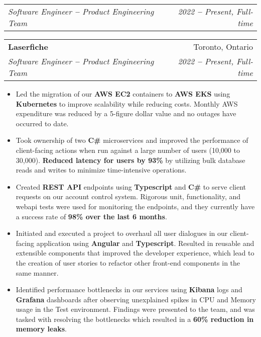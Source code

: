 \documentclass[letterpaper,10pt]{article}
\makeatletter
\newcommand{\resumeItem}[1]{
  \item\small{
    {#1 \vspace{-2pt}}
  }
}
\newcommand{\resumeSubheading}[4]{
  \vspace{-2pt}\item
    \ifthenelse{\equal{#1}{}}
    {
    \begin{tabular*}{0.97\textwidth}[t]{l@{\extracolsep{\fill}}r}
      \textit{\small#3} & \textit{\small #4} \\
    \end{tabular*}\vspace{-7pt}
    }
    {
    \begin{tabular*}{0.97\textwidth}[t]{l@{\extracolsep{\fill}}r}
      \textbf{#1} & #2 \\
      \textit{\small#3} & \textit{\small #4} \\
    \end{tabular*}\vspace{-7pt}
    }
}
\newcommand{\resumeItemListStart}{\begin{itemize}}
\newcommand{\resumeItemListEnd}{\end{itemize}\vspace{-5pt}}
\makeatother
\begin{document}
    \resumeSubheading
      {Laserfiche}{Toronto, Ontario}
      {Software Engineer \textbf{--} Product Engineering Team}{2022 \textbf{--} Present, Full-time}
        \resumeItemListStart
            \resumeItem{Led the migration of our \textbf{AWS EC2} containers to \textbf{AWS EKS} using \textbf{Kubernetes} to improve scalability while reducing costs. Monthly AWS expenditure was reduced by a 5-figure dollar value and no outages have occurred to date.}
            \resumeItem{Took ownership of two \textbf{C\#} microservices and improved the performance of client-facing actions when run against a large number of users (10,000 to 30,000). \textbf{Reduced latency for users by 93\%} by utilizing bulk database reads and writes to minimize time-intensive operations.}
            \resumeItem{Created \textbf{REST API} endpoints using \textbf{Typescript} and \textbf{C\#} to serve client requests on our account control system. Rigorous unit, functionality, and webapi tests were used for monitoring the endpoints, and they currently have a success rate of \textbf{98\% over the last 6 months}.}
            \resumeItem{Initiated and executed a project to overhaul all user dialogues in our client-facing application using \textbf{Angular} and \textbf{Typescript}. Resulted in reusable and extensible components that improved the developer experience, which lead to the creation of user stories to refactor other front-end components in the same manner.}
            \resumeItem{Identified performance bottlenecks in our services using \textbf{Kibana} logs and \textbf{Grafana} dashboards after observing unexplained spikes in CPU and Memory usage in the Test environment. Findings were presented to the team, and was tasked with resolving the bottlenecks which resulted in a \textbf{60\% reduction in memory leaks}.}
        \resumeItemListEnd
\end{document}
